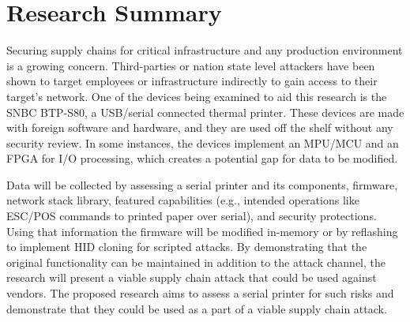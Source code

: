 \chapter{\leavevmode Research Summary}
\label{chap:researchsummary}

Securing supply chains for critical infrastructure and any production environment is a growing concern. Third-parties or nation state level attackers have been shown to target employees or infrastructure indirectly to gain access to their target's network. One of the devices being examined to aid this research is the SNBC BTP-S80, a USB/serial connected thermal printer. These devices are made with foreign software and hardware, and they are used off the shelf without any security review. In some instances, the devices implement an MPU/MCU and an FPGA for I/O processing, which creates a potential gap for data to be modified. 

Data will be collected by assessing a serial printer and its components, firmware, network stack library, featured capabilities (e.g., intended operations like ESC/POS commands to printed paper over serial), and security protections. Using that information the firmware will be modified in-memory or by reflashing to implement HID cloning for scripted attacks. By demonstrating that the original functionality can be maintained in addition to the attack channel, the research will present a viable supply chain attack that could be used against vendors. The proposed research aims to assess a serial printer for such risks and demonstrate that they could be used as a part of a viable supply chain attack.




